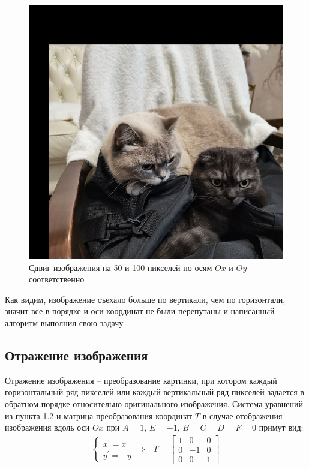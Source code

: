 \documentclass[a4paper, 16pt]{article}
\begin{document}
\begin{figure}[!htb]
    \centering
    \includegraphics[scale=0.3]{shifted_img.png}
    \captionsetup{skip=0pt}
    \caption{Сдвиг изображения на 50 и 100 пикселей по осям $Ox \text{ и } Oy$ соответственно}
    \label{Рис:2}
\end{figure}


\noindent Как видим, изображение съехало больше по вертикали, чем по горизонтали, значит все
в порядке и оси координат не были перепутаны и написанный алгоритм выполнил свою задачу


\subsection{Отражение изображения}
\noindent Отражение изображения -- преобразование картинки, при котором каждый горизонтальный ряд
пикселей или каждый вертикальный ряд пикселей задается в обратном порядке относительно оригинального
изображения. Система уравнений из пункта 1.2 и матрица преобразования координат $T$ в случае отображения
изображения вдоль оси $Ox$ при $A=1,\,E=-1,\,B=C=D=F=0$ примут вид:
\begin{align*}
    \begin{cases}
        x^{\prime}=x\\
        y^{\prime}=-y
    \end{cases}\Rightarrow\,\,\,\,
    T=
    \begin{bmatrix}
        1 &0 &0\\
        0 &-1 &0\\
        0 &0 &1
    \end{bmatrix}
\end{align*}
\end{document}
